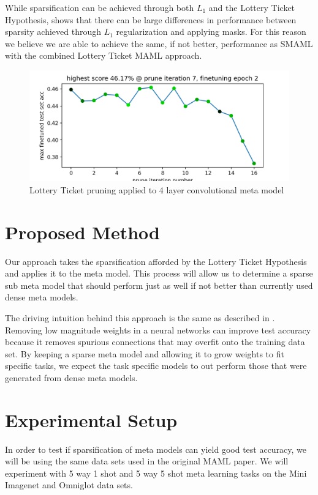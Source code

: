 \documentclass[twocolumn, 10pt]{article}
\begin{document}
While sparsification can be achieved through both $L_1$ and the Lottery Ticket Hypothesis, \cite{zero_sign_supermask} shows that there can be large differences in performance between sparsity achieved through $L_1$ regularization and applying masks. For this reason we believe we are able to achieve the same, if not better, performance as SMAML with the combined Lottery Ticket MAML approach.

\begin{figure}
\includegraphics[scale=.4]{accs_over_time.png}
\caption{Lottery Ticket pruning applied to 4 layer convolutional meta model}
\label{lth_maml}
\end{figure}

\section{Proposed Method}
Our approach takes the sparsification afforded by the Lottery Ticket Hypothesis and applies it to the meta model. This process will allow us to determine a sparse sub meta model that should perform just as well if not better than currently used dense meta models.

The driving intuition behind this approach is the same as described in \cite{frankle2019lottery}. Removing low magnitude weights in a neural networks can improve test accuracy because it removes spurious connections that may overfit onto the training data set. By keeping a sparse meta model and allowing it to grow weights to fit specific tasks, we expect the task specific models to out perform those that were generated from dense meta models.



\section{Experimental Setup}
In order to test if sparsification of meta models can yield good test accuracy, we will be using the same data sets used in the original MAML paper. We will experiment with 5 way 1 shot and 5 way 5 shot meta learning tasks on the Mini Imagenet and Omniglot data sets.
\end{document}
